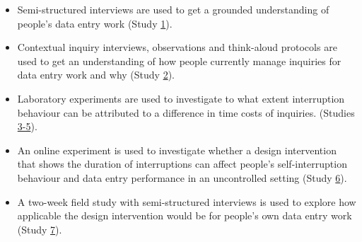 \begin{itemize}
\item Semi-structured interviews are used to get a grounded understanding of people's data entry work (Study \hyperref[st:Study1]{1}).
\item Contextual inquiry interviews, observations and think-aloud protocols are used to get an understanding of how people currently manage inquiries for data entry work and why (Study \hyperref[st:Study2]{2}).
\item Laboratory experiments are used to investigate to what extent interruption behaviour can be attributed to a difference in time costs of inquiries. (Studies \hyperref[st:Study3]{3-5}).
\item An online experiment is used to investigate whether a design intervention that shows the duration of interruptions can affect people's self-interruption behaviour and data entry performance in an uncontrolled setting (Study \hyperref[st:Study6]{6}).
\item A two-week field study with semi-structured interviews is used to explore how applicable the design intervention would be for people's own data entry work (Study \hyperref[st:Study7]{7}). 
\end{itemize}


